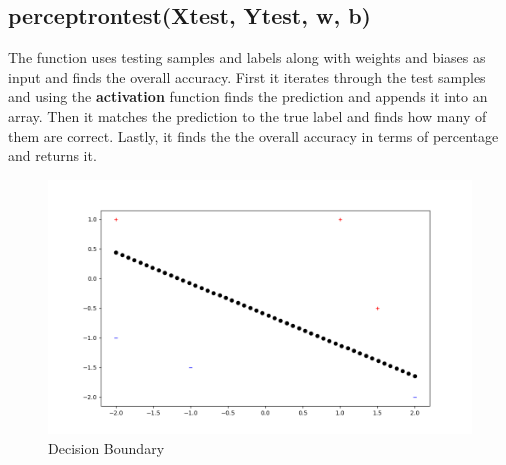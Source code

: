 \documentclass[12pt]{report}
\begin{document}
{\subsection{perceptron\textunderscore test(X\textunderscore test, Y\textunderscore test, w, b)} 
The function uses testing samples and labels along with weights and biases as input and finds the overall accuracy. First it iterates through the test samples and using the \textbf{activation} function finds the prediction and appends it into an array. Then it matches the prediction to the true label and finds how many of them are correct. Lastly, it finds the the overall accuracy in terms of percentage and returns it.
}

\begin{figure}[h]
    \centering
    \includegraphics[width=1.1\textwidth]{plot.png}
    \caption{Decision Boundary}
    \label{Decision Boundary}
\end{figure}{}
\end{document}
